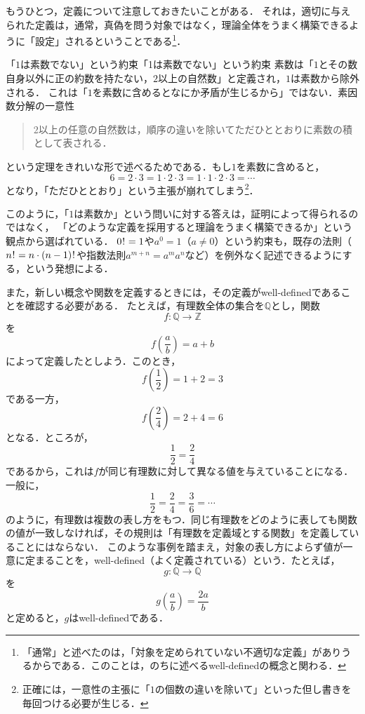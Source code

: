 もうひとつ，定義について注意しておきたいことがある．
それは，適切に与えられた定義は，通常，真偽を問う対象ではなく，理論全体をうまく構築できるように「設定」されるということである\footnote{「通常」と述べたのは，「対象を定められていない不適切な定義」がありうるからである．このことは，のちに述べるwell-definedの概念と関わる．}．
 
\begin{example}{「$1$は素数でない」という約束}{「1は素数でない」という約束}
  素数は「$1$とその数自身以外に正の約数を持たない，$2$以上の自然数」と定義され，$1$は素数から除外される．
  これは「$1$を素数に含めるとなにか矛盾が生じるから」ではない．素因数分解の一意性
  \begin{quote}
    $2$以上の任意の自然数は，順序の違いを除いてただひととおりに素数の積として表される．
  \end{quote}
  という定理をきれいな形で述べるためである．もし$1$を素数に含めると，
  \[
    6 = 2 \cdot 3 = 1 \cdot 2 \cdot 3 = 1 \cdot 1 \cdot 2 \cdot 3 = \cdots
  \]
  となり，「ただひととおり」という主張が崩れてしまう\footnote{正確には，一意性の主張に「$1$の個数の違いを除いて」といった但し書きを毎回つける必要が生じる．}．
\end{example}

このように，「$1$は素数か」という問いに対する答えは，証明によって得られるのではなく，
「どのような定義を採用すると理論をうまく構築できるか」という観点から選ばれている．
$0\mkern1mu!\mkern1mu = 1$や$a^0 = 1$（$a \ne 0$）という約束も，既存の法則（$n\mkern1mu!\mkern1mu = n \cdot (n-1)\mkern1mu!\mkern1mu$や指数法則$a^{m+n} = a^m a^n$など）を例外なく記述できるようにする，という発想による．

また，新しい概念や関数を定義するときには，その定義がwell-definedであることを確認する必要がある．
たとえば，有理数全体の集合を$\mathbb{Q}$とし，関数
\[
  f \colon \mathbb{Q} \to \mathbb{Z}
\]
を
\[
  f\left(\frac{a}{b}\right)=a+b
\]
によって定義したとしよう．このとき，
\[
  f\left(\frac12\right)=1+2=3
\]
である一方，
\[
  f\left(\frac24\right)=2+4=6
\]
となる．ところが，
\[
  \frac12=\frac24
\]
であるから，これは$f$が同じ有理数に対して異なる値を与えていることになる．一般に，
\[
  \frac12=\frac24=\frac36=\cdots
\]
のように，有理数は複数の表し方をもつ．同じ有理数をどのように表しても関数の値が一致しなければ，その規則は「有理数を定義域とする関数」を定義していることにはならない．
このような事例を踏まえ，対象の表し方によらず値が一意に定まることを，well-defined（よく定義されている）という．たとえば，
\[
g \colon \mathbb{Q} \to \mathbb{Q}
\]
を
\[
g\!\left(\frac{a}{b}\right)=\frac{2a}{b}
\]
と定めると，$g$はwell-definedである．

